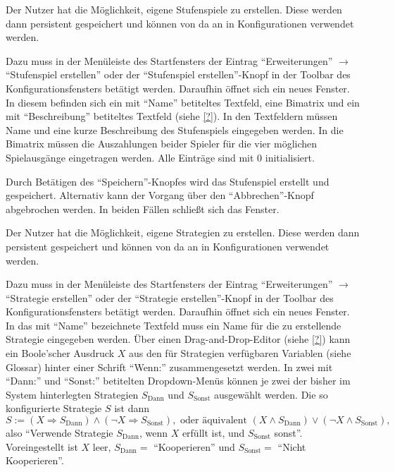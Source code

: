 \documentclass[parskip=full,11pt]{scrartcl}
\begin{document}
Der Nutzer hat die Möglichkeit, eigene Stufenspiele zu erstellen. Diese werden dann persistent gespeichert und können von da an in Konfigurationen verwendet werden.

Dazu muss in der Menüleiste des Startfensters der Eintrag \enquote{Erweiterungen} \(\rightarrow\) \enquote{Stufenspiel erstellen} oder der \enquote{Stufenspiel erstellen}-Knopf in der Toolbar des Konfigurationsfensters betätigt werden. Daraufhin öffnet sich ein neues Fenster. In diesem befinden sich ein mit \enquote{Name} betiteltes Textfeld, eine Bimatrix und ein mit \enquote{Beschreibung} betiteltes Textfeld (siehe \cref{?}). In den Textfeldern müssen Name und eine kurze Beschreibung des Stufenspiels eingegeben werden. In die Bimatrix müssen die Auszahlungen beider Spieler für die vier möglichen Spielausgänge eingetragen werden. Alle Einträge sind mit \(0\) initialisiert.

Durch Betätigen des \enquote{Speichern}-Knopfes wird das Stufenspiel erstellt und gespeichert. Alternativ kann der Vorgang über den \enquote{Abbrechen}-Knopf abgebrochen werden. In beiden Fällen schließt sich das Fenster.

Der Nutzer hat die Möglichkeit, eigene Strategien zu erstellen. Diese werden dann persistent gespeichert und können von da an in Konfigurationen verwendet werden.

Dazu muss in der Menüleiste des Startfensters der Eintrag \enquote{Erweiterungen} \(\rightarrow\) \enquote{Strategie erstellen} oder der \enquote{Strategie erstellen}-Knopf in der Toolbar des Konfigurationsfensters betätigt werden. Daraufhin öffnet sich ein neues Fenster. In das mit \enquote{Name} bezeichnete Textfeld muss ein Name für die zu erstellende Strategie eingegeben werden. Über einen Drag-and-Drop-Editor (siehe \cref{?}) kann ein Boole'scher Ausdruck \(X\) aus den für Strategien verfügbaren Variablen (siehe Glossar) hinter einer Schrift \enquote{Wenn:} zusammengesetzt werden. In zwei mit \enquote{Dann:} und \enquote{Sonst:} betitelten Dropdown-Menüs können je zwei der bisher im System hinterlegten Strategien \(S_\text{Dann}\) und \(S_\text{Sonst}\) ausgewählt werden. Die so konfigurierte Strategie \(S\) ist dann
\[
S := (X \Rightarrow S_\text{Dann}) \land (\lnot X \Rightarrow S_\text{Sonst}), \text{ oder äquivalent } (X \land S_\text{Dann}) \lor (\lnot X \land S_\text{Sonst}),
\]
also \enquote{Verwende Strategie \(S_\text{Dann}\), wenn \(X\) erfüllt ist, und \(S_\text{Sonst}\) sonst}. Voreingestellt ist \(X\) leer, \(S_\text{Dann} =\) \enquote{Kooperieren} und \(S_\text{Sonst} =\) \enquote{Nicht Kooperieren}.
\end{document}
